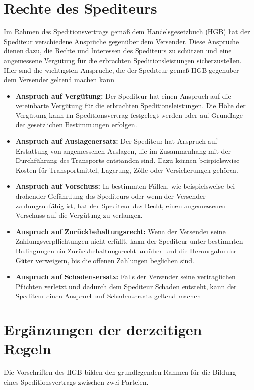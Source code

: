 \section{Rechte des Spediteurs}
Im Rahmen des Speditionsvertrags gemäß dem Handelsgesetzbuch (HGB) hat der Spediteur verschiedene Ansprüche gegenüber dem Versender. Diese Ansprüche dienen dazu, die Rechte und Interessen des Spediteurs zu schützen und eine angemessene Vergütung für die erbrachten Speditionsleistungen sicherzustellen. Hier sind die wichtigsten Ansprüche, die der Spediteur gemäß HGB gegenüber dem Versender geltend machen kann:
\begin{itemize}
    \item \textbf{Anspruch auf Vergütung:} Der Spediteur hat einen Anspruch auf die vereinbarte Vergütung für die erbrachten Speditionsleistungen. Die Höhe der Vergütung kann im Speditionsvertrag festgelegt werden oder auf Grundlage der gesetzlichen Bestimmungen erfolgen.
    \item \textbf{Anspruch auf Auslagenersatz:} Der Spediteur hat Anspruch auf Erstattung von angemessenen Auslagen, die im Zusammenhang mit der Durchführung des Transports entstanden sind. Dazu können beispielsweise Kosten für Transportmittel, Lagerung, Zölle oder Versicherungen gehören.
    \item \textbf{Anspruch auf Vorschuss:} In bestimmten Fällen, wie beispielsweise bei drohender Gefährdung des Spediteurs oder wenn der Versender zahlungsunfähig ist, hat der Spediteur das Recht, einen angemessenen Vorschuss auf die Vergütung zu verlangen.
    \item \textbf{Anspruch auf Zurückbehaltungsrecht:} Wenn der Versender seine Zahlungsverpflichtungen nicht erfüllt, kann der Spediteur unter bestimmten Bedingungen ein Zurückbehaltungsrecht ausüben und die Herausgabe der Güter verweigern, bis die offenen Zahlungen beglichen sind.
    \item \textbf{Anspruch auf Schadensersatz:} Falls der Versender seine vertraglichen Pflichten verletzt und dadurch dem Spediteur Schaden entsteht, kann der Spediteur einen Anspruch auf Schadensersatz geltend machen.
\end{itemize}

\section{Ergänzungen der derzeitigen Regeln}
Die Vorschriften des HGB bilden den grundlegenden Rahmen für die Bildung eines Speditionsvertrags zwischen zwei Parteien.

